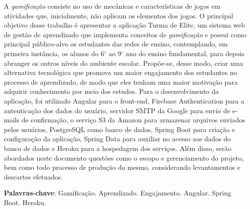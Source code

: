 \setlength{\absparsep}{18pt} %
\begin{resumo}

 \vspace{\onelineskip}

 A \textit{gamificação} consiste no uso de mecânicas e características de jogos em atividades que, inicialmente, não aplicam os elementos dos jogos. O principal objetivo desse trabalho é apresentar a aplicação Turma de Elite, um sistema web de gestão de aprendizado que implementa conceitos de \textit{gamificação} e possui como principal público-alvo os estudantes das redes de ensino, contemplando, em primeira instância, os alunos do 6$^\circ$ ao 9$^\circ$ ano do ensino fundamental, para depois abranger os outros níveis do ambiente escolar. Propõe-se, desse modo, criar uma alternativa tecnológica que promova um maior engajamento dos estudantes no processo de aprendizado, de modo que eles tenham uma maior motivação para adquirir conhecimento por meio dos estudos. Para o desenvolvimento da aplicação, foi utilizado Angular para o front-end, Firebase Authentication para a autenticação dos dados do usuário, servidor SMTP da Google para envio de e-mails de confirmação, o serviço S3 da Amazon para armazenar arquivos enviados pelos usuários, PostgreSQL como banco de dados, Spring Boot para criação e configuração da aplicação, Spring Data para auxiliar no acesso aos dados do banco de dados e Heroku para a hospedagem dos serviços. Além disso, serão abordados neste documento questões como o escopo e gerenciamento do projeto, bem como todo processo de produção do mesmo, considerando levantamentos e descartes efetuados. 
 
 
 \vspace{\onelineskip}
 
 \textbf{Palavras-chave}: Gamificação. Aprendizado. Engajamento. Angular. Spring Boot. Heroku.
 
\end{resumo}

